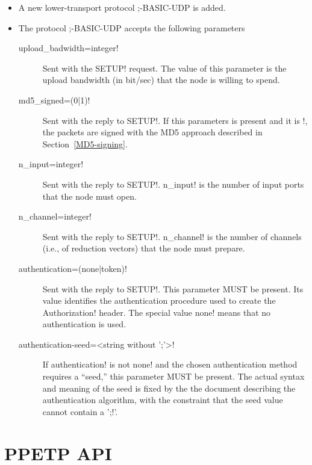 \documentclass{rfc}
\begin{document}
\begin{itemize}
  \item A new lower-transport protocol \ppmtp;-BASIC-UDP is added.
  \item The protocol \ppmtp;-BASIC-UDP accepts the following parameters
    \begin{description}
      \item[\ttt upload\_badwidth=integer!] Sent with the \ttt SETUP!
      request.  The value of this parameter is the upload bandwidth
      (in bit/sec) that the node is willing to spend.
      \item[\ttt md5\_signed=(0|1)!] Sent with the reply to \ttt
      SETUP!. If this parameters is present and it is !, the
      packets are signed with the MD5 approach described in
      Section~\ref{MD5-signing}.  
      \item[\ttt n\_input=integer!] Sent with the reply to \ttt SETUP!. \ttt
      n_input! is the number of input ports that the node must open.
      \item[\ttt n\_channel=integer!] Sent with the reply to \ttt SETUP!. \ttt
      n_channel! is the number of channels (i.e., of reduction
      vectors) that the node must prepare.
      \item[\ttt authentication=(none|token)!] Sent with the reply to \ttt
      SETUP!. This parameter MUST be present.  Its value identifies the
      authentication procedure used to create the \ttt Authorization!
      header.  The special value \ttt none! means that no
      authentication is used.
      \item[\ttt authentication-seed=<string without ';'>!]  If \ttt
      authentication! is not \ttt none! and the chosen authentication
      method requires a ``seed,'' this parameter MUST be present.  The
      actual syntax and meaning of the seed is fixed by the the
      document describing the authentication algorithm, with the
      constraint that the seed value cannot contain a '\ttt ;!'.
    \end{description}
\end{itemize}

\chapter{PPETP API}
\label{sect:9;transport_layer}





\end{document}
